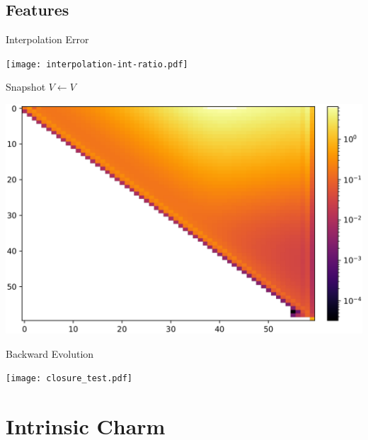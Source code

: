 \documentclass[9pt]{beamer}
\begin{document}
\subsection{Features}
\begin{frame}{\eko{} Interpolation Error}
	\begin{center}
		\texttt{[image: interpolation-int-ratio.pdf]}
	\end{center}
\end{frame}
\begin{frame}{\eko{} Snapshot $V\leftarrow V$}
	\begin{center}
		\includegraphics[width=\linewidth]{VvV.png}
	\end{center}
\end{frame}
\begin{frame}{\eko{} Backward Evolution}
	\begin{center}
		\texttt{[image: closure\_test.pdf]}
	\end{center}
\end{frame}

\section{Intrinsic Charm}
\end{document}
